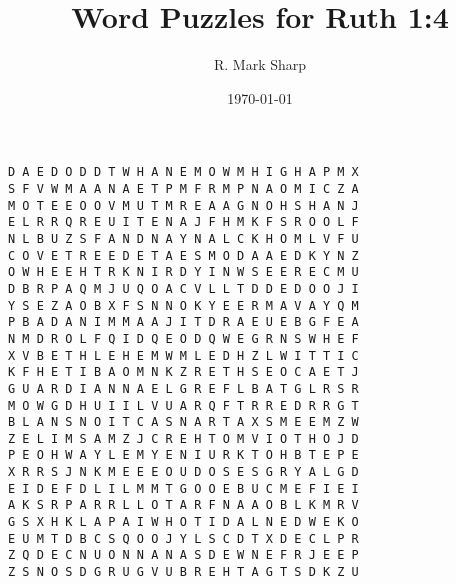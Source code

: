 \documentclass[12pt,a4paper,article]{memoir}\usepackage{graphicx, color}
\title{Word Puzzles for Ruth 1:4}
\subtitle{}
\author{R. Mark Sharp}
\date{\today}
\begin{document}
\maketitle











\clearpage
\Large
\begin{verbatim}
D A E D O D D T W H A N E M O W M H I G H A P M X 
S F V W M A A N A E T P M F R M P N A O M I C Z A 
M O T E E O O V M U T M R E A A G N O H S H A N J 
E L R R Q R E U I T E N A J F H M K F S R O O L F 
N L B U Z S F A N D N A Y N A L C K H O M L V F U 
C O V E T R E E D E T A E S M O D A A E D K Y N Z 
O W H E E H T R K N I R D Y I N W S E E R E C M U 
D B R P A Q M J U Q O A C V L L T D D E D O O J I 
Y S E Z A O B X F S N N O K Y E E R M A V A Y Q M 
P B A D A N I M M A A J I T D R A E U E B G F E A 
N M D R O L F Q I D Q E O D Q W E G R N S W H E F 
X V B E T H L E H E M W M L E D H Z L W I T T I C 
K F H E T I B A O M N K Z R E T H S E O C A E T J 
G U A R D I A N N A E L G R E F L B A T G L R S R 
M O W G D H U I I L V U A R Q F T R R E D R R G T 
B L A N S N O I T C A S N A R T A X S M E E M Z W 
Z E L I M S A M Z J C R E H T O M V I O T H O J D 
P E O H W A Y L E M Y E N I U R K T O H B T E P E 
X R R S J N K M E E E O U D O S E S G R Y A L G D 
E I D E F D L I L M M T G O O E B U C M E F I E I 
A K S R P A R R L L O T A R F N A A O B L K M R V 
G S X H K L A P A I W H O T I D A L N E D W E K O 
E U M T D B C S Q O O J Y L S C D T X D E C L P R 
Z Q D E C N U O N N A N A S D E W N E F R J E E P 
Z S N O S D G R U G V U B R E H T A G T S D K Z U 


\end{verbatim}
\clearpage
\normalsize
\end{document}
